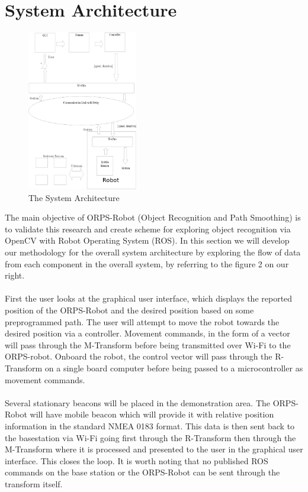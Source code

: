 \documentclass[english,12pt]{article}
\begin{document}
\section{System Architecture}

\begin{figure}
    \vspace{-20pt}
    \begin{center}
      \includegraphics[width=0.43\textwidth]{sys_arc.jpg}
    \end{center}
    \vspace{-20pt}
    \caption{The System Architecture}
    \vspace{-10pt}
  \end{figure}
The main objective of ORPS-Robot (Object
Recognition and Path Smoothing) is to
validate this research
and create scheme for exploring object
recognition via OpenCV with Robot
Operating System (ROS). In this section
we will develop our methodology for the
overall system architecture by exploring
the flow of data from each component in
the overall system, by referring to the
figure 2 on our right.\\\\
First the user looks at the graphical user
interface, which displays the reported
position of the ORPS-Robot and the
desired position based on some preprogrammed
path. The user will attempt
to move the robot towards the desired
position via a controller.
Movement commands, in the form of a
vector will pass through the M-Transform
before being transmitted over Wi-Fi to
the ORPS-robot. Onboard the robot, the
control vector will pass through the R-Transform
on a single board computer before
being passed to a microcontroller as
movement commands.\\\\
Several stationary beacons will be
placed in the demonstration area. The ORPS-Robot will have mobile beacon which will
provide it with relative position information in the standard NMEA 0183 format. This data is then sent
back to the basestation via Wi-Fi going first through the R-Transform then through the M-Transform
where it is processed and presented to the user in the graphical user interface. This closes the loop. It is
worth noting that no published ROS commands on the base station or the ORPS-Robot can be sent
through the transform itself.
\end{document}

